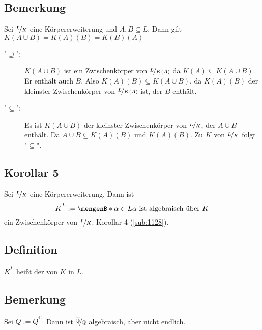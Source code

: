 \subsection[Bemerkung: Die Reihenfolge beim Erzeugen von Körpererweiterung ist irrelevant]{Bemerkung} %
\label{sub:1129}
Sei $\nicefrac{L}{K}$ eine Körpererweiterung und $A,B \subseteq L$. Dann gilt $K(A \cup B) = K(A)(B) = K(B)(A)$
\begin{description}
	\item["$\supseteq$":] $K(A \cup B)$ ist ein Zwischenkörper von $\nicefrac{L}{K(A)}$ da $K(A) \subseteq K(A \cup B)$. Er enthält auch $B$. Also 
	$K(A)(B) \subseteq K(A \cup B)$, da $K(A)(B)$ der kleinster Zwischenkörper von $\nicefrac{L}{K(A)}$ ist, der $B$ enthält.
	\item["$\subseteq $":] Es ist $K(A \cup B)$ der kleinster Zwischenkörper von $\nicefrac{L}{K}$, der $A \cup B$ enthält. Da $A \cup B \subseteq K(A)(B)$ und
	$K(A)(B)$. Zu $K$ von $\nicefrac{L}{K}$ folgt "$\subseteq $"{}. 
\end{description}

\subsection[Korollar 5: Der algebraische Abschluss ist ein Zwischenkörper]{Korollar 5} %
\label{sub:1130}
Sei $\nicefrac{L}{K}$ eine Körpererweiterung. Dann ist 
\[
	\overline{K}^L := \set[\alpha \in L]{\alpha \text{ ist algebraisch über }K}  
\]
ein Zwischenkörper von $\nicefrac{L}{K}$.
Korollar 4 (\ref{sub:1128}). 

\subsection[Definition: Algebraischer Abschluss]{Definition} %
\label{sub:1131}
$\overline{K}^L $ heißt der  von $K$ in $L$.

\subsection[Bemerkung: Algebraischer Abschluss von $\mathds{Q}$]{Bemerkung} %
\label{sub:1132}
Sei $\overline{Q} := \overline{Q}^\mathds{C}  $. Dann ist $\nicefrac{\overline{\mathds{Q}} }{\mathds{Q}}$ algebraisch, aber nicht endlich.

